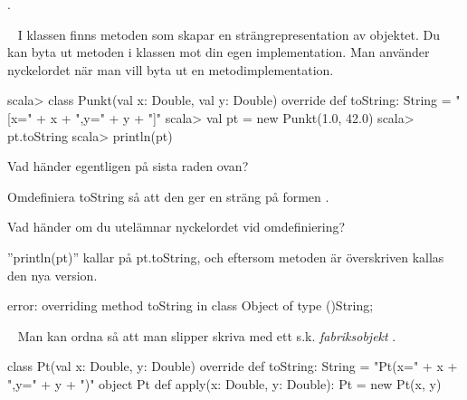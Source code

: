 \QUESTEND








. 

\QUESTBEGIN

\Task  \what~ I klassen  finns metoden  som skapar en strängrepresentation av objektet. Du kan byta ut metoden  i klassen  mot din egen implementation. Man använder nyckelordet  när man vill byta ut en metodimplementation.

\begin{REPL}
scala> class Punkt(val x: Double, val y: Double) {
         override def toString: String = "[x=" + x + ",y=" + y + "]"
       }
scala> val pt = new Punkt(1.0, 42.0)
scala> pt.toString
scala> println(pt)
\end{REPL}

\Subtask Vad händer egentligen på sista raden ovan?

\Subtask Omdefiniera toString så att den ger en sträng på formen .

\Subtask Vad händer om du utelämnar nyckelordet  vid omdefiniering?

\SOLUTION


\TaskSolved \what
 

\SubtaskSolved 
''println(pt)'' kallar på pt.toString, och eftersom metoden är överskriven kallas den nya version.

\SubtaskSolved   {}

\SubtaskSolved 
error: overriding method toString in class Object of type ()String;


\QUESTEND









\QUESTBEGIN

\Task  \what~  Man kan ordna så att man slipper skriva  med ett s.k. \emph{fabriksobjekt} .
\begin{Code}
class Pt(val x: Double, y: Double) {
  override def toString: String = "Pt(x=" + x + ",y=" + y + ")"
}
object Pt {
  def apply(x: Double, y: Double): Pt = new Pt(x, y)
}
\end{Code}

